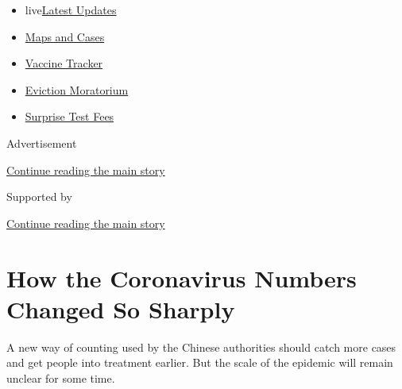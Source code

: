 \begin{itemize}
\tightlist
\item
  live\href{https://www.nytimes3xbfgragh.onion/2020/09/09/world/covid-19-coronavirus.html?name=styln-coronavirus-national\&region=TOP_BANNER\&block=storyline_menu_recirc\&action=click\&pgtype=Article\&impression_id=976905f0-f2bb-11ea-a9c4-bbcb0334804d\&variant=undefined}{Latest
  Updates}
\item
  \href{https://www.nytimes3xbfgragh.onion/interactive/2020/us/coronavirus-us-cases.html?name=styln-coronavirus-national\&region=TOP_BANNER\&block=storyline_menu_recirc\&action=click\&pgtype=Article\&impression_id=976905f1-f2bb-11ea-a9c4-bbcb0334804d\&variant=undefined}{Maps
  and Cases}
\item
  \href{https://www.nytimes3xbfgragh.onion/interactive/2020/science/coronavirus-vaccine-tracker.html?name=styln-coronavirus-national\&region=TOP_BANNER\&block=storyline_menu_recirc\&action=click\&pgtype=Article\&impression_id=976905f2-f2bb-11ea-a9c4-bbcb0334804d\&variant=undefined}{Vaccine
  Tracker}
\item
  \href{https://www.nytimes3xbfgragh.onion/2020/09/02/your-money/eviction-moratorium-covid.html?name=styln-coronavirus-national\&region=TOP_BANNER\&block=storyline_menu_recirc\&action=click\&pgtype=Article\&impression_id=976905f3-f2bb-11ea-a9c4-bbcb0334804d\&variant=undefined}{Eviction
  Moratorium}
\item
  \href{https://www.nytimes3xbfgragh.onion/2020/09/09/upshot/coronavirus-surprise-test-fees.html?name=styln-coronavirus-national\&region=TOP_BANNER\&block=storyline_menu_recirc\&action=click\&pgtype=Article\&impression_id=976905f4-f2bb-11ea-a9c4-bbcb0334804d\&variant=undefined}{Surprise
  Test Fees}
\end{itemize}

Advertisement

\protect\hyperlink{after-top}{Continue reading the main story}

Supported by

\protect\hyperlink{after-sponsor}{Continue reading the main story}

\hypertarget{how-the-coronavirus-numbers-changed-so-sharply}{%
\section{How the Coronavirus Numbers Changed So
Sharply}\label{how-the-coronavirus-numbers-changed-so-sharply}}

A new way of counting used by the Chinese authorities should catch more
cases and get people into treatment earlier. But the scale of the
epidemic will remain unclear for some time.

